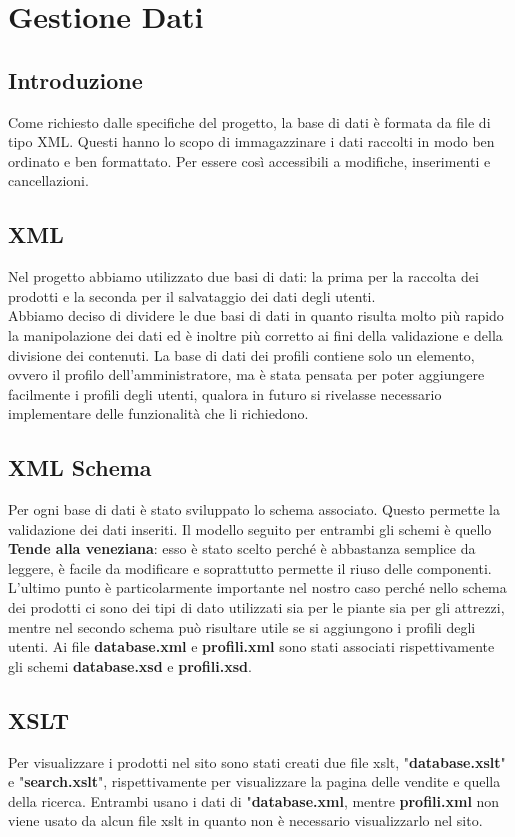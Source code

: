 \section{Gestione Dati}{
	\subsection{Introduzione}
	Come richiesto dalle specifiche del progetto, la base di dati è formata da file di tipo XML. Questi hanno lo scopo di immagazzinare i dati raccolti in modo ben ordinato e ben formattato. Per essere così accessibili a modifiche, inserimenti e cancellazioni.
	\subsection{XML}
	Nel progetto abbiamo utilizzato due basi di dati: la prima per la raccolta dei prodotti e la seconda per il salvataggio dei dati degli utenti.\\
Abbiamo deciso di dividere le due basi di dati in quanto risulta molto più rapido la manipolazione dei dati
ed è inoltre più corretto ai fini della validazione e della divisione dei contenuti.
La base di dati dei profili contiene solo un elemento, ovvero il profilo dell'amministratore, ma è stata pensata per poter aggiungere facilmente i profili degli utenti, qualora in futuro si rivelasse necessario implementare delle funzionalità che li richiedono. 
	\subsection{XML Schema}
	Per ogni base di dati è stato sviluppato lo schema associato. Questo permette la validazione dei dati inseriti. Il modello seguito per entrambi gli schemi è quello \textbf{Tende alla veneziana}: esso è stato scelto perché è abbastanza semplice da leggere, è facile da modificare e soprattutto permette il riuso delle componenti. L'ultimo punto è particolarmente importante nel nostro caso perché nello schema dei prodotti ci sono dei tipi di dato utilizzati sia per le piante sia per gli attrezzi, mentre nel secondo schema può risultare utile se si aggiungono i profili degli utenti.
	Ai file \textbf{database.xml} e \textbf{profili.xml} sono stati associati rispettivamente gli schemi \textbf{database.xsd} e \textbf{profili.xsd}.
	\subsection{XSLT}
	Per visualizzare i prodotti nel sito sono stati creati due file xslt, "\textbf{database.xslt}" e "\textbf{search.xslt}", rispettivamente per visualizzare la pagina delle vendite e quella della ricerca. Entrambi usano i dati di "\textbf{database.xml}, mentre \textbf{profili.xml} non viene usato da alcun file xslt in quanto non è necessario visualizzarlo nel sito.
}